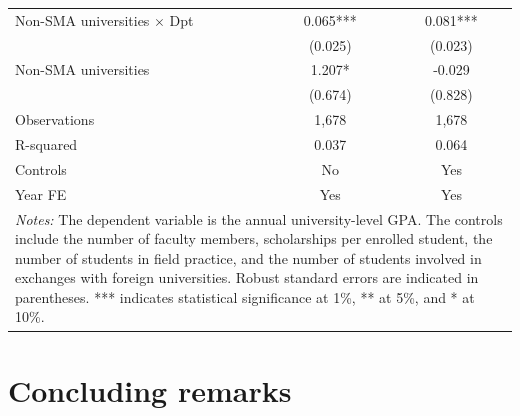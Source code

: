 \documentclass[aspectratio=169,xcolor=dvipsnames,handout]{beamer}
\begin{document}
\begin{frame}[allowframebreaks]
\begin{table}
\begin{tabular}{lcc}
        \midrule
        Non-SMA universities $\times$ Dpt         & 0.065*** & 0.081*** \\
                                                & (0.025)  & (0.023)  \\
        Non-SMA universities                      & 1.207*   & -0.029   \\
                                                & (0.674)  & (0.828)  \\
        \midrule
        Observations                              & 1,678    & 1,678    \\
        R-squared                                 & 0.037    & 0.064    \\
        Controls                                  & No       & Yes      \\
        Year FE                                   & Yes      & Yes      \\
        \bottomrule
        \multicolumn{3}{p{11cm}}{\tiny\textit{Notes:} The dependent variable is the annual university-level GPA\@. The controls include the number of faculty members, scholarships per enrolled student, the number of students in field practice, and the number of students involved in exchanges with foreign universities. Robust standard errors are indicated in parentheses. *** indicates statistical significance at 1\%, ** at 5\%, and * at 10\%.} \\
        \end{tabular}
    \end{table}
\end{frame}

\section{Concluding remarks}%
\end{document}
